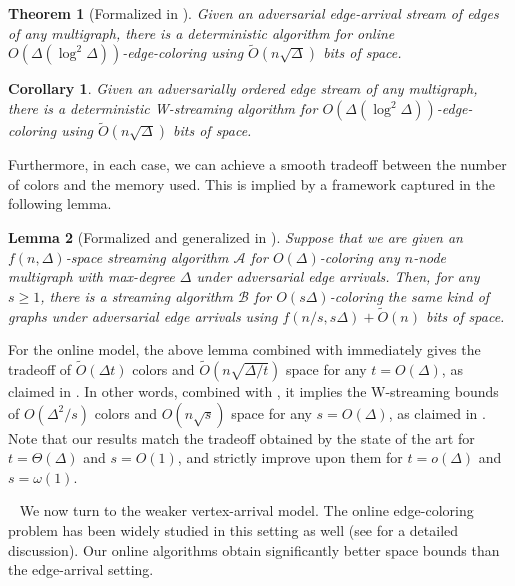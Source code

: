 \documentclass[10pt]{article}
\newtheorem{theorem}{Theorem}[section]
\newtheorem{lemma}[theorem]{Lemma}
\newtheorem{corollary}[lemma]{Corollary}
\theoremstyle{definition}\newtheorem{definition}[lemma]{Definition}
\theoremstyle{remark}  \newtheorem*{remark}{Remark}
\newcommand{\cA}{\mathcal{A}}
\newcommand{\cB}{\mathcal{B}}
\newcommand{\tO}{\widetilde{O}}
\newcommand{\mypar}[1]{\medskip\noindent{\bfseries #1.}~}
\begin{document}
\begin{theorem}[Formalized in ]\label{thm:online-det-ea-edgecol}
  Given an adversarial edge-arrival stream of edges of any multigraph, there is a deterministic algorithm for online $O(\Delta (\log^2 \Delta))$-edge-coloring using $\tO(n \sqrt{\Delta})$ bits of space. 
\end{theorem}

\begin{corollary}\label{cor:wstream-det-ea}
    Given an adversarially ordered  edge stream of any multigraph, there is a deterministic W-streaming algorithm for $O(\Delta (\log^2 \Delta))$-edge-coloring using $\tO(n \sqrt{\Delta})$ bits of space.
\end{corollary}



Furthermore, in each case, we can achieve a smooth tradeoff between the number of colors and the memory used. This is implied by a framework captured in the following lemma.

\begin{lemma}[Formalized and generalized in ]\label{lem:space-color-tradeoff}
  Suppose that we are given an $f(n,\Delta)$-space streaming algorithm $\cA$ for $O(\Delta)$-coloring any $n$-node multigraph with max-degree $\Delta$ under adversarial edge arrivals. Then, for any $s\geq 1$, there is a streaming algorithm $\cB$ for $O(s \Delta)$-coloring the same kind of graphs under adversarial edge arrivals using $f(n/s, s\Delta)+ \tO(n)$ bits of space.
\end{lemma}

For the online model, the above lemma combined with  immediately gives the tradeoff of $\tO(\Delta t)$ colors and $\tO(n\sqrt{\Delta/t})$ space for any $t= O(\Delta)$, as claimed in .  In other words, combined with , it implies the W-streaming bounds of $O(\Delta^2/s)$ colors and $O(n\sqrt{s})$ space for any $s= O(\Delta)$, as claimed in . Note that our results match the tradeoff obtained by the state of the art for $t=\Theta(\Delta)$ and $s=O(1)$, and strictly improve upon them for $t=o(\Delta)$ and $s=\omega(1)$.


\mypar{Vertex-Arrival Model} We now turn to the weaker vertex-arrival model.  The online edge-coloring problem has been widely studied in this setting as well (see  for a detailed discussion). Our online algorithms obtain significantly better space bounds than the edge-arrival setting. 
\end{document}
